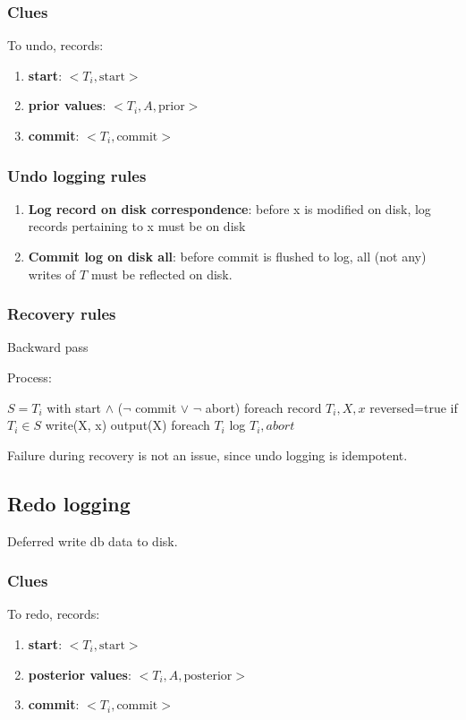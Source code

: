\documentclass[a4paper]{report}
\begin{document}
\subsubsection{Clues}
To undo, records: 
\begin{enumerate}
\item \textbf{start}: $<T_i, \text{start}>$
\item \textbf{prior values}: $<T_i, A, \text{prior}>$
\item \textbf{commit}: $<T_i, \text{commit}>$
\end{enumerate}

\subsubsection{Undo logging rules}
\begin{enumerate}
\item \textbf{Log record on disk  correspondence}: before x is modified on disk, log records pertaining to x must be on disk
\item \textbf{Commit log on disk  all}: before commit is flushed to log, all (not any) writes of $T$ must be reflected on disk.
\end{enumerate}

\newpage
\subsubsection{Recovery rules}
Backward pass

Process:
\begin{pseudo}
$S = T_i$ with start $\wedge$ ($\neg$ commit $\vee$ $\neg$ abort)
foreach record $T_i, X, x$ reversed=true
  if $T_i \in S$
    write(X, x) 
    output(X)
foreach $T_i$
  log $T_i, abort$
\end{pseudo}
Failure during recovery is not an issue, since undo logging is idempotent.



\subsection{Redo logging}
Deferred write db data to disk. 
\subsubsection{Clues}
To redo, records: 
\begin{enumerate}
\item \textbf{start}: $<T_i, \text{start}>$
\item \textbf{posterior values}: $<T_i, A, \text{posterior}>$
\item \textbf{commit}: $<T_i, \text{commit}>$
\end{enumerate}
\end{document}

